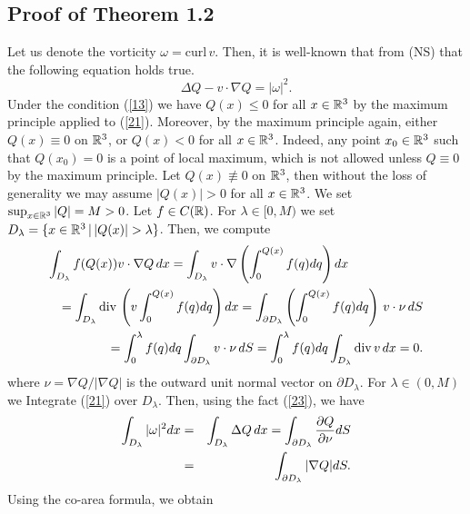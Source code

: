 \documentclass[12pt]{article}
\numberwithin{equation}{section}
\theoremstyle{definition}
\begin{document}
\subsection {Proof of Theorem 1.2}
    Let us denote the vorticity ${\omega}=\mathrm{curl}\, v$. Then, it is well-known that from (NS)  that the following equation holds true.
\begin{equation}\label{21}
\Delta Q-v\cdot\nabla Q=|{\omega}|^2.
\end{equation}
Under the condition (\ref{13}) we have $Q(x)\leq 0$ for all $x\in \Bbb R^3$ by the maximum principle applied to (\ref{21}). 
Moreover, by the maximum principle again, either $Q(x)\equiv 0$ on $\Bbb R^3$, or $Q(x)<0$ for all $x\in \Bbb R^3$.
Indeed, any point $x_0\in \Bbb R^3$ such that $Q(x_0)=0$ is a point of local maximum, which is not allowed unless $Q\equiv 0$ by the maximum principle.
 Let  $Q(x)\not\equiv0$ on $\Bbb R^3$,  then without the loss of generality we may assume $|Q(x)| >0$ for all $x\in \Bbb R^3$.
We  set $\sup_{x\in \Bbb R^3} |Q|=M>0$.  
Let $f\in C(\Bbb R)$. For ${\lambda} \in [0, M)$ we set $D_{\lambda} =\{ x\in \Bbb R^3\, |\, |Q(x)| >{\lambda} \}$. Then, we compute
\begin{eqnarray}\label{23}
\lefteqn{\int_{D_{\lambda} }  f(Q(x))v\cdot \nabla Q \, dx=
\int_{D_{\lambda} } v\cdot \nabla \left(\int_0 ^{Q(x)} f(q) dq\right) dx}{\nonumber} \\
&&= \int_{  D_{\lambda}} \mathrm{div}\, \left(v \int_0 ^{Q(x)} f(q ) dq \right) dx = \int_{\partial D_{\lambda}}  \left(\int_0 ^{Q(x)} f(q) dq\right)\, v\cdot \nu\, dS{\nonumber} \\
&&= \int_0 ^{\lambda}  f(q) dq \int_{\partial D_{\lambda}}   v\cdot \nu \, dS= \int_0 ^{\lambda}  f(q) dq \int_{D_{\lambda}}   \mathrm{div} \, v\, dx=0.
\end{eqnarray} 
where $\nu=\nabla Q/|\nabla Q|$ is the outward unit normal vector on  $\partial D_{\lambda}$.
For ${\lambda} \in (0, M)$ we Integrate (\ref{21}) over $D_{\lambda}$. Then, using the fact (\ref{23}), we have
\begin{eqnarray}\label{24}
\int_{D_{\lambda}} |{\omega}|^2 dx &=& \int_{D_{\lambda}} \Delta Q \,dx =\int_{\partial D_{\lambda}} \frac{\partial Q}{\partial \nu}  dS{\nonumber} \\
&=& \int_{\partial D_{\lambda}} |\nabla Q| dS.
\end{eqnarray}
Using the co-area formula, we obtain
\end{document}
